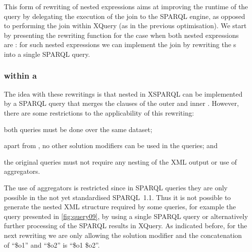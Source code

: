 This form of rewriting of nested expressions aims at improving the runtime of the query by delegating the execution of
the join to the SPARQL engine, as opposed to performing the join within XQuery (as in the previous optimisation).
%
We start by presenting the rewriting function for the case when both nested expressions are :
%
for such nested expressions we can implement the join by rewriting the \SparqlForClause{}s into a single SPARQL query.

\subsubsection{\SparqlForClause within a \SparqlForClause}
\label{sec:query-rewriting}
%
The idea with these rewritings is that nested  in XSPARQL can be implemented by a SPARQL query that
merges the \WHERE clauses of the outer and inner \SparqlForClause.
%
However, there are some restrictions to the applicability of this rewriting: 
\begin{inparaenum}[(i)]
\item both queries must be done over the same dataset;
\item apart from \ORDERBY, no other solution modifiers can be used in the queries; and
\item the original queries must not require any nesting of the \ac{XML} output or use of aggregators.
\end{inparaenum}
%
The use of aggregators is restricted since in SPARQL queries they are only possible in the not yet standardised
SPARQL~1.1.  Thus it is not possible to generate the nested \ac{XML} structure required by some queries, for example the
query presented in \cref{fig:query09}, by using a single SPARQL query or alternatively further processing of the
SPARQL results in XQuery.
%
As indicated before, for the next rewriting we are only allowing the \ORDERBY solution modifier and the concatenation of
``\ORDERBY \$o1'' and ``\ORDERBY \$o2'' is ``\ORDERBY \$o1 \$o2''.


